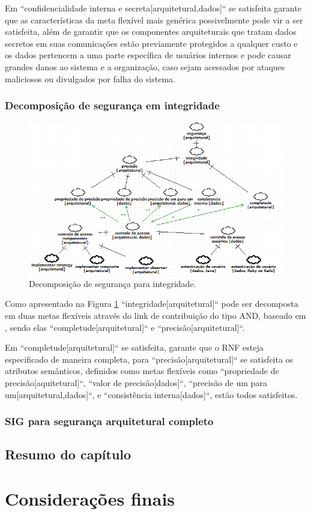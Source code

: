 Em ``confidencialidade interna e secreta[arquitetural,dados]`` se satisfeita garante que as características da meta flexível mais genérica possivelmente pode vir a ser satisfeita, além de garantir que os componentes arquiteturais que tratam dados secretos em suas comunicações estão previamente protegidos a qualquer custo e os dados pertencem a uma parte específica de usuários internos e pode causar grandes danos ao sistema e a organização, caso sejam acessados por ataques maliciosos ou divulgados por falha do sistema. 

\newpage

\subsection{Decomposição de segurança em integridade}

\begin{figure}[h!]
	\centering
	\includegraphics[keepaspectratio=true,scale=0.9]{figuras/SIG-Integridade.PNG}
	\caption{Decomposição de segurança para integridade.}
	\label{DecomposicaoIntegridade}
\end{figure}

Como apresentado na Figura \ref{DecomposicaoIntegridade} ``integridade[arquitetural]`` pode ser decomposta em duas metas flexíveis através do link de contribuição do tipo AND, baseado em \cite{chung2012non}, sendo elas ``completude[arquitetural]`` e ``precisão[arquitetural]``.

Em ``completude[arquitetural]`` se satisfeita, garante que o RNF esteja especificado de maneira completa, para ``precisão[arquitetural]`` se satisfeita os atributos semânticos, definidos como metas flexíveis como ``propriedade de precisão[aquitetural]``, ``valor de precisão[dados]``, ``precisão de um para um[arquitetural,dados]``, e ``consistência interna[dados]``, estão todos satisfeitos.


\subsection{SIG para segurança arquitetural completo}



\section{Resumo do capítulo}

\chapter{Considerações finais}
\label{chap:consideracoesFinais}